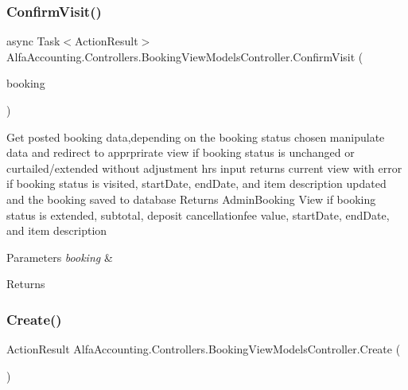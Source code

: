 \subsubsection{\texorpdfstring{Confirm\+Visit()}{ConfirmVisit()}\hspace{0.1cm}{\footnotesize\ttfamily [2/2]}}
{\footnotesize\ttfamily async Task$<$Action\+Result$>$ Alfa\+Accounting.\+Controllers.\+Booking\+View\+Models\+Controller.\+Confirm\+Visit (\begin{DoxyParamCaption}\item[{\mbox{[}\+Bind(\+Include = \char`\"{}\+Booking\+Id,\+Booked\+Date,\+Booking\+Start\+Date\+Time,\+Booking\+End\+Date\+Time,\+Booking\+Status,\+Booking\+Adjustment\+Hrs,\+Item\+Description,\+Subtotal,\+Booking\+Deposit,\+Booking\+Cancellation\+Fee,\+Unit\+Price\+Id,\+Id,\+Invoice\+Id\char`\"{})\mbox{]} Booking}]{booking }\end{DoxyParamCaption})}



Get posted booking data,depending on the booking status chosen manipulate data and redirect to apprprirate view if booking status is unchanged or curtailed/extended without adjustment hrs input returns current view with error if booking status is visited, start\+Date, end\+Date, and item description updated and the booking saved to database Returns Admin\+Booking View if booking status is extended, subtotal, deposit cancellationfee value, start\+Date, end\+Date, and item description 


\begin{DoxyParams}{Parameters}
{\em booking} & \\
\hline
\end{DoxyParams}
\begin{DoxyReturn}{Returns}

\end{DoxyReturn}
\mbox{\label{class_alfa_accounting_1_1_controllers_1_1_booking_view_models_controller_a6aab0900b3c5209a8674b3b909d7532b}} 
\subsubsection{\texorpdfstring{Create()}{Create()}}
{\footnotesize\ttfamily Action\+Result Alfa\+Accounting.\+Controllers.\+Booking\+View\+Models\+Controller.\+Create (\begin{DoxyParamCaption}{ }\end{DoxyParamCaption})}



